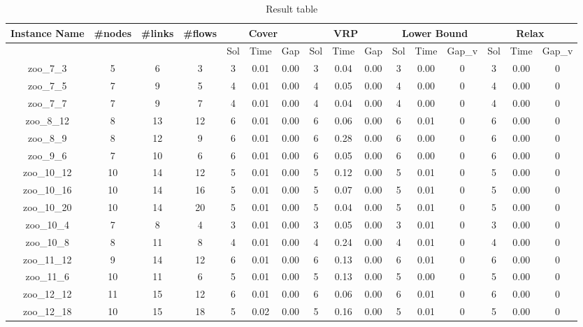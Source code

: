 \begin{landscape}
\begin{longtable}{|c|c|c|c|c|c|c|c|c|c|c|c|c|c|c|c|}
\caption{Result table}
\hline
Instance Name & \#nodes & \#links & \#flows & \multicolumn{3}{c|}{Cover} & \multicolumn{3}{c|}{VRP} & \multicolumn{3}{c|}{Lower Bound} & \multicolumn{3}{c|}{Relax} \\ \hline
& & & & Sol & Time & Gap & Sol & Time & Gap & Sol & Time & Gap_v & Sol & Time & Gap_v \\ \hline
zoo\_7\_3 & 5 & 6 & 3 & 3 & 0.01 & 0.00 & 3 & 0.04 & 0.00 & 3 & 0.00 & 0 & 3 & 0.00 & 0 \\ \hline 
zoo\_7\_5 & 7 & 9 & 5 & 4 & 0.01 & 0.00 & 4 & 0.05 & 0.00 & 4 & 0.00 & 0 & 4 & 0.00 & 0 \\ \hline 
zoo\_7\_7 & 7 & 9 & 7 & 4 & 0.01 & 0.00 & 4 & 0.04 & 0.00 & 4 & 0.00 & 0 & 4 & 0.00 & 0 \\ \hline 
zoo\_8\_12 & 8 & 13 & 12 & 6 & 0.01 & 0.00 & 6 & 0.06 & 0.00 & 6 & 0.01 & 0 & 6 & 0.00 & 0 \\ \hline 
zoo\_8\_9 & 8 & 12 & 9 & 6 & 0.01 & 0.00 & 6 & 0.28 & 0.00 & 6 & 0.00 & 0 & 6 & 0.00 & 0 \\ \hline 
zoo\_9\_6 & 7 & 10 & 6 & 6 & 0.01 & 0.00 & 6 & 0.05 & 0.00 & 6 & 0.00 & 0 & 6 & 0.00 & 0 \\ \hline 
zoo\_10\_12 & 10 & 14 & 12 & 5 & 0.01 & 0.00 & 5 & 0.12 & 0.00 & 5 & 0.01 & 0 & 5 & 0.00 & 0 \\ \hline 
zoo\_10\_16 & 10 & 14 & 16 & 5 & 0.01 & 0.00 & 5 & 0.07 & 0.00 & 5 & 0.01 & 0 & 5 & 0.00 & 0 \\ \hline 
zoo\_10\_20 & 10 & 14 & 20 & 5 & 0.01 & 0.00 & 5 & 0.04 & 0.00 & 5 & 0.01 & 0 & 5 & 0.00 & 0 \\ \hline 
zoo\_10\_4 & 7 & 8 & 4 & 3 & 0.01 & 0.00 & 3 & 0.05 & 0.00 & 3 & 0.01 & 0 & 3 & 0.00 & 0 \\ \hline 
zoo\_10\_8 & 8 & 11 & 8 & 4 & 0.01 & 0.00 & 4 & 0.24 & 0.00 & 4 & 0.01 & 0 & 4 & 0.00 & 0 \\ \hline 
zoo\_11\_12 & 9 & 14 & 12 & 6 & 0.01 & 0.00 & 6 & 0.13 & 0.00 & 6 & 0.01 & 0 & 6 & 0.00 & 0 \\ \hline 
zoo\_11\_6 & 10 & 11 & 6 & 5 & 0.01 & 0.00 & 5 & 0.13 & 0.00 & 5 & 0.00 & 0 & 5 & 0.00 & 0 \\ \hline 
zoo\_12\_12 & 11 & 15 & 12 & 6 & 0.01 & 0.00 & 6 & 0.06 & 0.00 & 6 & 0.01 & 0 & 6 & 0.00 & 0 \\ \hline 
zoo\_12\_18 & 10 & 15 & 18 & 5 & 0.02 & 0.00 & 5 & 0.16 & 0.00 & 5 & 0.01 & 0 & 5 & 0.00 & 0 \\ \hline 

\end{longtable}
\end{landscape}
